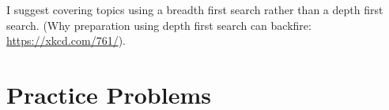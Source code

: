 \documentclass[11  pt]{exam}
\begin{document}
I suggest covering topics using a breadth first search rather than a depth first search. (Why preparation using depth first search can backfire: \url{https://xkcd.com/761/}).

\newpage


	
	\section{Practice Problems}
	
\end{document}
